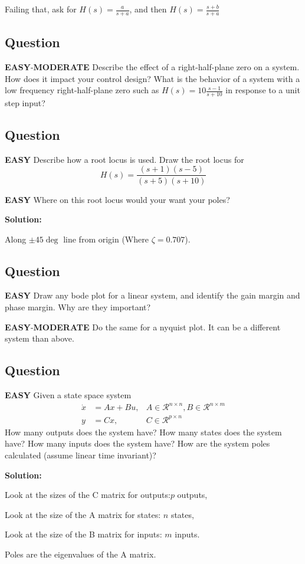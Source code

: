 \documentclass{article}
\newenvironment{Solution}{
\begin{tcolorbox}
\color{purple}
\textbf{Solution:}
}
{
\end{tcolorbox}
\ignorespacesafterend
}
\newcommand{\RatingBase}[2]{\textcolor{#1}{{\fontfamily{phv}\selectfont\textbf{#2}}}}
\newcommand{\Easy}{\RatingBase{green!50!black!50}{EASY}}
\newcommand{\Moderate}{\RatingBase{yellow!50!black!50}{MODERATE}}
\begin{document}
Failing that, ask for $H(s) = \frac{a}{s+a}$, and then $H(s) = \frac{s+b}{s+a}$
\subsection{Question} \Easy{}-\Moderate{}
Describe the effect of a right-half-plane zero on a system.  How does it impact your control design?  What is the behavior of a system with a low frequency right-half-plane zero such as $H(s) = 10\frac{s-1}{s+10}$ in response to a unit step input?


\subsection{Question} \Easy{}
Describe how a root locus is used.  Draw the root locus for 
\begin{equation}
H(s) = \frac{(s+1)(s-5)}{(s+5)(s+10)}
\end{equation}

\Easy{} Where on this root locus would your want your poles?

\begin{Solution} 
Along $\pm 45\deg$ line from origin (Where $\zeta=0.707$).
\end{Solution}


\subsection{Question} \Easy{}
Draw any bode plot for a linear system, and identify the gain margin and phase margin.  Why are they important? 

\Easy{}-\Moderate{} Do the same for a nyquist plot.  It can be  a different system than above.

\subsection{Question} \Easy{}
Given a state space system
\begin{align}
\dot{x}&=Ax + Bu,  &A\in\mathcal{R}^{n\times n}, B\in \mathcal{R}^{n \times m} \\
y &= Cx,  &C \in \mathcal{R}^{p \times  n}
\end{align}
How many outputs does the system have?
How many states does the system have?
How many inputs does the system have?
How are the system poles calculated (assume linear time invariant)?
\begin{Solution}
Look at the sizes of the C matrix for outputs:$p$ outputs, 

Look at the size of the A matrix for states: $n$ states, 

Look at the size of the B matrix for inputs: $m$ inputs.

Poles are the eigenvalues of the A matrix.
\end{Solution}
\end{document}
